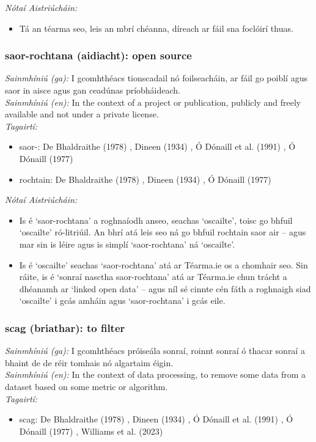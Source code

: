  \noindent \textit{Nótaí Aistriúcháin:}
\begin{itemize}
	\item Tá an téarma seo, leis an mbrí chéanna, díreach ar fáil sna foclóirí thuas.
\end{itemize}


\subsubsection*{saor-rochtana (aidiacht): open source}
 \noindent \textit{Sainmhíniú (ga):} I gcomhthéacs tionscadail nó foilseacháin, ar fáil go poiblí agus saor in aisce agus gan ceadúnas príobháideach.
\\
 \noindent \textit{Sainmhíniú (en):} In the context of a project or publication, publicly and freely available and not under a private license.
\\
 \noindent \textit{Tagairtí:}
\begin{itemize}
	\item saor-: De Bhaldraithe (1978) \cite{de-bhaldraithe}, Dineen (1934) \cite{dineen}, Ó Dónaill et al. (1991) \cite{focloir-beag}, Ó Dónaill (1977) \cite{odonaill}
	\item rochtain: De Bhaldraithe (1978) \cite{de-bhaldraithe}, Dineen (1934) \cite{dineen}, Ó Dónaill (1977) \cite{odonaill}
\end{itemize}

 \noindent \textit{Nótaí Aistriúcháin:}
\begin{itemize}
	\item Is é `saor-rochtana' a roghnaíodh anseo, seachas `oscailte', toisc go bhfuil `oscailte' ró-litriúil. An bhrí atá leis seo ná go bhfuil rochtain saor air -- agus mar sin is léire agus is simplí `saor-rochtana' ná `oscailte'.
	\item Is é `oscailte' seachas `saor-rochtana' atá ar Téarma.ie os a chomhair seo. Sin ráite, is é `sonraí nasctha saor-rochtana' atá ar Téarma.ie chun trácht a dhéanamh ar `linked open data' -- agus níl sé cinnte cén fáth a roghnaigh siad `oscailte' i gcás amháin agus `saor-rochtana' i gcás eile.
\end{itemize}


\subsubsection*{scag (briathar): to filter}
 \noindent \textit{Sainmhíniú (ga):} I gcomhthéacs próiseála sonraí, roinnt sonraí ó thacar sonraí a bhaint de de réir tomhais nó algartaim éigin.
\\
 \noindent \textit{Sainmhíniú (en):} In the context of data processing, to remove some data from a dataset based on some metric or algorithm.
\\
 \noindent \textit{Tagairtí:}
\begin{itemize}
	\item scag: De Bhaldraithe (1978) \cite{de-bhaldraithe}, Dineen (1934) \cite{dineen}, Ó Dónaill et al. (1991) \cite{focloir-beag}, Ó Dónaill (1977) \cite{odonaill}, Williams et al. (2023) \cite{storchiste}
\end{itemize}

